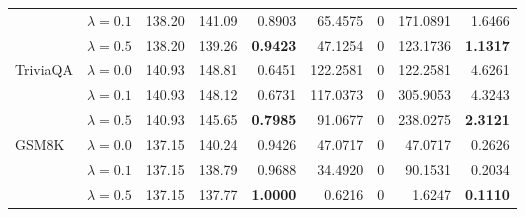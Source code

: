 \begin{table}[t]
{\begin{tabular}{l l rrrrrrr}
 & $\lambda{=}0.1$ & 138.20 & 141.09 & \cellcolor{red!18} 0.8903 & \cellcolor{red!18} 65.4575 & \cellcolor{cyan!12} $0$ & \cellcolor{red!18} 171.0891 & \cellcolor{red!18} 1.6466 \\
 & $\lambda{=}0.5$ & 138.20 & 139.26 & \cellcolor{red!18} \textbf{0.9423} & \cellcolor{red!18} 47.1254 & \cellcolor{cyan!12} $0$ & \cellcolor{red!18} 123.1736 & \cellcolor{red!18} \textbf{1.1317} \\
\midrule
TriviaQA & $\lambda{=}0.0$ & 140.93 & 148.81 & \cellcolor{red!35} 0.6451 & \cellcolor{red!35} 122.2581 & \cellcolor{cyan!12} $0$ & \cellcolor{red!35} 122.2581 & \cellcolor{red!35} 4.6261 \\
 & $\lambda{=}0.1$ & 140.93 & 148.12 & \cellcolor{red!35} 0.6731 & \cellcolor{red!35} 117.0373 & \cellcolor{cyan!12} $0$ & \cellcolor{red!35} 305.9053 & \cellcolor{red!35} 4.3243 \\
 & $\lambda{=}0.5$ & 140.93 & 145.65 & \cellcolor{red!35} \textbf{0.7985} & \cellcolor{red!35} 91.0677 & \cellcolor{cyan!12} $0$ & \cellcolor{red!35} 238.0275 & \cellcolor{red!35} \textbf{2.3121} \\
\midrule
GSM8K & $\lambda{=}0.0$ & 137.15 & 140.24 & \cellcolor{red!18} 0.9426 & \cellcolor{red!18} 47.0717 & \cellcolor{cyan!12} $0$ & \cellcolor{red!18} 47.0717 & \cellcolor{red!18} 0.2626 \\
 & $\lambda{=}0.1$ & 137.15 & 138.79 & 0.9688 & 34.4920 & \cellcolor{cyan!12} $0$ & 90.1531 & 0.2034 \\
 & $\lambda{=}0.5$ & 137.15 & 137.77 & \textbf{1.0000} & 0.6216 & \cellcolor{cyan!12} $0$ & 1.6247 & \textbf{0.1110} \\
\bottomrule
\end{tabular}}
\end{table}